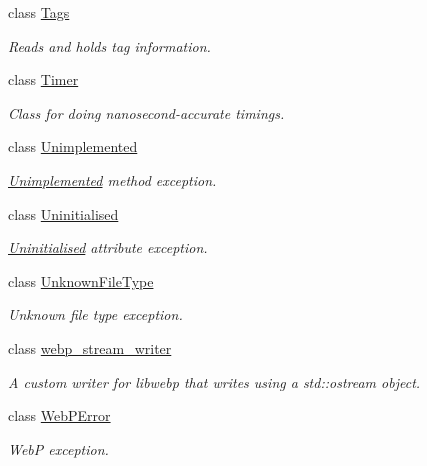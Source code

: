 \begin{DoxyCompactItemize}
class \hyperlink{class_photo_finish_1_1_tags}{Tags}
\begin{DoxyCompactList}\small\item\em Reads and holds tag information. \end{DoxyCompactList}\item 
class \hyperlink{class_photo_finish_1_1_timer}{Timer}
\begin{DoxyCompactList}\small\item\em Class for doing nanosecond-\/accurate timings. \end{DoxyCompactList}\item 
class \hyperlink{class_photo_finish_1_1_unimplemented}{Unimplemented}
\begin{DoxyCompactList}\small\item\em \hyperlink{class_photo_finish_1_1_unimplemented}{Unimplemented} method exception. \end{DoxyCompactList}\item 
class \hyperlink{class_photo_finish_1_1_uninitialised}{Uninitialised}
\begin{DoxyCompactList}\small\item\em \hyperlink{class_photo_finish_1_1_uninitialised}{Uninitialised} attribute exception. \end{DoxyCompactList}\item 
class \hyperlink{class_photo_finish_1_1_unknown_file_type}{Unknown\+File\+Type}
\begin{DoxyCompactList}\small\item\em Unknown file type exception. \end{DoxyCompactList}\item 
class \hyperlink{class_photo_finish_1_1webp__stream__writer}{webp\+\_\+stream\+\_\+writer}
\begin{DoxyCompactList}\small\item\em A custom writer for libwebp that writes using a std\+::ostream object. \end{DoxyCompactList}\item 
class \hyperlink{class_photo_finish_1_1_web_p_error}{Web\+P\+Error}
\begin{DoxyCompactList}\small\item\em WebP exception. \end{DoxyCompactList}\end{DoxyCompactItemize}
